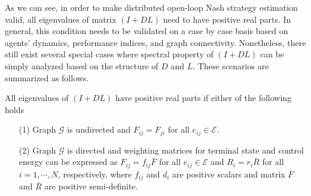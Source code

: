 \documentclass[10pt,doublecolumn]{IEEEtran}  %
\begin{document}
As we can see, in order to make distributed open-loop Nash strategy estimation valid, all eigenvalues of matrix $(I+DL)$ need to have positive real parts. In general, this condition needs to be validated on a case by case basis based on agents' dynamics, performance indices, and graph connectivity. Nonetheless, there still exist several special cases where
spectral property of $(I+DL)$ can be simply analyzed based on the structure of $D$ and $L$. These scenarios are summarized as follows.
\begin{Pro}
All eigenvalues of $(I+DL)$ have positive real parts if either of the following holds
\begin{itemize}
\item[(1)] Graph $\mathcal{G}$ is undirected and $F_{ij}=F_{ji}$ for all $e_{ij}\in\mathcal{E}$. 
\item[(2)] Graph $\mathcal{G}$ is directed and weighting matrices for terminal state and control energy can be expressed as $F_{ij}=f_{ij}\bar{F}$ for all $e_{ij}\in\mathcal{E}$ and $R_i=r_i\bar{R}$ for all $i=1,\cdots,N$, respectively, where $f_{ij}$ and $d_i$ are positive scalars and matrix $\bar{F}$ and $\bar{R}$ are positive semi-definite.  
\end{itemize} 
\end{Pro}
\end{document}
